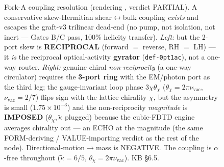 \begin{figure}[htbp]
\caption{Fork-A coupling resolution (rendering , verdict PARTIAL). A conservative skew-Hermitian shear$\leftrightarrow$bulk coupling \emph{exists} and escapes the graft-v3 trilinear dead-end (no pump, not isolation, not inert --- Gates B/C pass, 100\% helicity transfer). \emph{Left:} but the 2-port skew is \textbf{RECIPROCAL} (forward $=$ reverse, RH $=$ LH) --- it \emph{is} the reciprocal optical-activity \textbf{gyrator} (\texttt{def-0pt1ac}), not a one-way router. \emph{Right:} genuine chiral \emph{non-reciprocity} (a one-way circulator) requires the \textbf{3-port ring} with the EM/photon port as the third leg; the gauge-invariant loop phase $3\chi\theta_\chi$ ($\theta_\chi=2\pi\nu_{\mathrm{vac}}$, $\nu_{\mathrm{vac}}=2/7$) flips sign with the lattice chirality $\chi$, but the asymmetry is small ($1.75\times10^{-3}$) and the non-reciprocity \emph{magnitude} is \textbf{IMPOSED} ($\theta_\chi,\tilde\kappa$ plugged) because the cubic-FDTD engine averages chirality out --- an ECHO at the magnitude (the same FORM-deriving / VALUE-importing verdict as the rest of the node). Directional-motion$\to$mass is NEGATIVE. The coupling is $\alpha$-free throughout ($\tilde\kappa=6/5$, $\theta_\chi=2\pi\nu_{\mathrm{vac}}$). KB  \S6.5.}
\label{fig:vol9_node_circulator_ring}
\end{figure}
